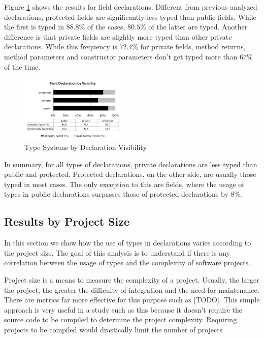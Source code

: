 \documentclass[preprint]{sigplanconf}
\begin{document}
Figure \ref{fig:field_visibility} shows the results for field declarations. 
Different from previous analyzed declarations, protected fields are significantly less typed than public fields. 
While the first is typed in $88.8\%$ of the cases, $80.5\%$ of the latter are typed.
Another difference is that private fields are slightly more typed than other private declarations.
While this frequency is $72.4\%$ for private fields, method returns, method parameters and constructor parameters don't get typed more than $67\%$ of the time.


\begin{figure}[ht]
\centering \includegraphics[width=0.45\textwidth]{field_visibility} 
\caption{Type Systems by Declaration Visibility}
\label{fig:field_visibility} 
\end{figure}

In summary, for all types of declarations, private declarations are less typed than public and protected.
Protected declarations, on the other side, are usually those typed in most cases. The only exception to this are fields, where the usage of types in public declarations surpasses those of protected declarations by $8\%$.

\subsection{Results by Project Size\label{sub:size-results}}
In this section we show how the use of types in declarations varies according to the project size. 
The goal of this analysis is to understand if there is any correlation between the usage of types and the complexity of software projects. 

Project size is a means to measure the complexity of a project.
Usually, the larger the project, the greater the difficulty of integration and the need for maintenance. 
There are metrics far more effective for this purpose such as [TODO].
This simple approach is very useful in a study such as this because it doesn't require the source code to be compiled to determine the project complexity. 
Requiring projects to be compiled would drastically limit the number of projects
\end{document}
